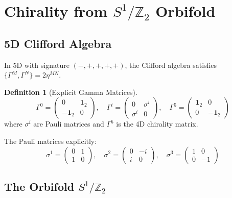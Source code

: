 \documentclass[12pt,a4paper]{article}
\theoremstyle{definition}
\newtheorem{definition}[theorem]{Definition}
\theoremstyle{remark}
\begin{document}
\section{Chirality from $S^1/\mathbb{Z}_2$ Orbifold}
\label{sec:chirality}

\subsection{5D Clifford Algebra}

In 5D with signature $(-,+,+,+,+)$, the Clifford algebra satisfies $\{\Gamma^M, \Gamma^N\} = 2\eta^{MN}$.

\begin{definition}[Explicit Gamma Matrices]
\begin{equation}
\Gamma^0 = \begin{pmatrix} 0 & \mathbf{1}_2 \\ -\mathbf{1}_2 & 0 \end{pmatrix}, \quad
\Gamma^i = \begin{pmatrix} 0 & \sigma^i \\ \sigma^i & 0 \end{pmatrix}, \quad
\Gamma^5 = \begin{pmatrix} \mathbf{1}_2 & 0 \\ 0 & -\mathbf{1}_2 \end{pmatrix}
\end{equation}
where $\sigma^i$ are Pauli matrices and $\Gamma^5$ is the 4D chirality matrix.
\end{definition}

The Pauli matrices explicitly:
\begin{equation}
\sigma^1 = \begin{pmatrix} 0 & 1 \\ 1 & 0 \end{pmatrix}, \quad
\sigma^2 = \begin{pmatrix} 0 & -i \\ i & 0 \end{pmatrix}, \quad
\sigma^3 = \begin{pmatrix} 1 & 0 \\ 0 & -1 \end{pmatrix}
\end{equation}

\subsection{The Orbifold $S^1/\mathbb{Z}_2$}
\end{document}
